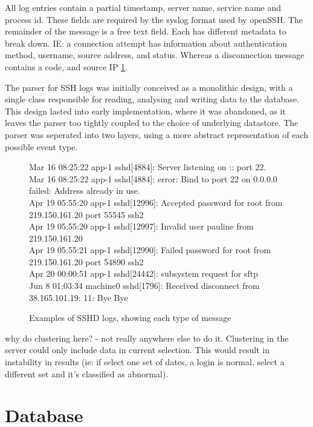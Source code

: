 All log entries contain a partial timestamp, server name, service name and process id. These fields are required by the syslog format used by openSSH. The remainder of the message is a free text field. Each has different metadata to break down. IE:  a connection attempt has information about authentication method, username, source address, and status. Whereas a disconnection message contains a code, and source IP \ref{log_examples}.

The parser for SSH logs was initially conceived as a monolithic design, with a single class responsible for reading, analysing and writing data to the database. This design lasted into early implementation, where it was abandoned, as it leaves the parser too tightly coupled to the choice of underlying datastore. The parser was seperated into two layers, using a more abstract representation of each possible event type.

\begin{figure}[tbh]
\parbox{.99\textwidth}{
{\small Mar 16 08:25:22 app-1 sshd[4884]: Server listening on :: port 22. \\
Mar 16 08:25:22 app-1 sshd[4884]: error: Bind to port 22 on 0.0.0.0 failed: Address already in use. \\
Apr 19 05:55:20 app-1 sshd[12996]: Accepted password for root from 219.150.161.20 port 55545 ssh2 \\
Apr 19 05:55:20 app-1 sshd[12997]: Invalid user pauline from 219.150.161.20 \\
Apr 19 05:55:21 app-1 sshd[12990]: Failed password for root from 219.150.161.20 port 54890 ssh2 \\
Apr 20 00:00:51 app-1 sshd[24442]: subsystem request for sftp \\
Jun 8 01:03:34 machine0 sshd[1796]: Received disconnect from 38.165.101.19: 11: Bye Bye \\}}
\caption{Examples of SSHD logs, showing each type of message}
\label{log_examples}
\end{figure}

why do clustering here? - not really anywhere else to do it. Clustering in the server could only include data in current selection. This would result in instability in results (ie: if select one set of dates, a login is normal, select a different set and it's classified as abnormal). 

\section{Database} 

